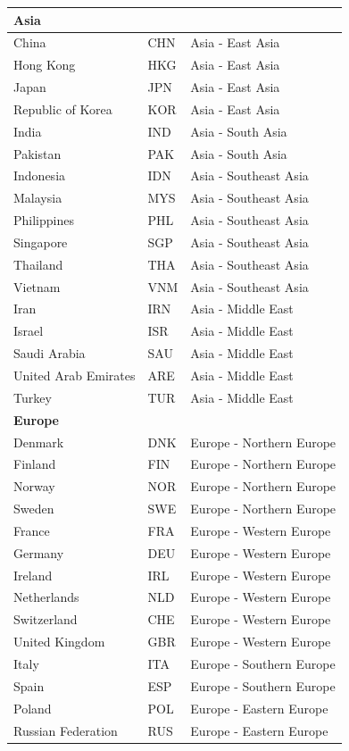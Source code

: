 \begin{longtable}{llp{6cm}}
\multicolumn{3}{l}{\textbf{Asia}} \\
\midrule
China & CHN & Asia - East Asia \\
Hong Kong & HKG & Asia - East Asia \\
Japan & JPN & Asia - East Asia \\
Republic of Korea & KOR & Asia - East Asia \\
India & IND & Asia - South Asia \\
Pakistan & PAK & Asia - South Asia \\
Indonesia & IDN & Asia - Southeast Asia \\
Malaysia & MYS & Asia - Southeast Asia \\
Philippines & PHL & Asia - Southeast Asia \\
Singapore & SGP & Asia - Southeast Asia \\
Thailand & THA & Asia - Southeast Asia \\
Vietnam & VNM & Asia - Southeast Asia \\
Iran & IRN & Asia - Middle East \\
Israel & ISR & Asia - Middle East \\
Saudi Arabia & SAU & Asia - Middle East \\
United Arab Emirates & ARE & Asia - Middle East \\
Turkey & TUR & Asia - Middle East \\
\midrule

\multicolumn{3}{l}{\textbf{Europe}} \\
\midrule
Denmark & DNK & Europe - Northern Europe \\
Finland & FIN & Europe - Northern Europe \\
Norway & NOR & Europe - Northern Europe \\
Sweden & SWE & Europe - Northern Europe \\
France & FRA & Europe - Western Europe \\
Germany & DEU & Europe - Western Europe \\
Ireland & IRL & Europe - Western Europe \\
Netherlands & NLD & Europe - Western Europe \\
Switzerland & CHE & Europe - Western Europe \\
United Kingdom & GBR & Europe - Western Europe \\
Italy & ITA & Europe - Southern Europe \\
Spain & ESP & Europe - Southern Europe \\
Poland & POL & Europe - Eastern Europe \\
Russian Federation & RUS & Europe - Eastern Europe \\

\end{longtable}
